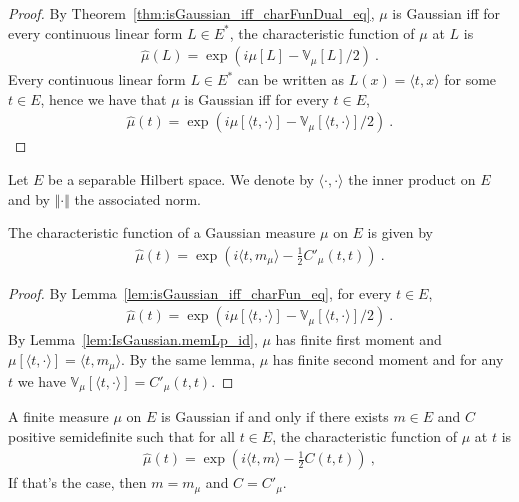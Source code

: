 \begin{proof}\leanok
By Theorem~\ref{thm:isGaussian_iff_charFunDual_eq}, $\mu$ is Gaussian iff for every continuous linear form $L \in E^*$, the characteristic function of $\mu$ at $L$ is
\begin{align*}
  \hat{\mu}(L) = \exp\left(i \mu[L] - \mathbb{V}_\mu[L] / 2\right) \: .
\end{align*}
Every continuous linear form $L \in E^*$ can be written as $L(x) = \langle t, x \rangle$ for some $t \in E$, hence we have that $\mu$ is Gaussian iff for every $t \in E$,
\begin{align*}
  \hat{\mu}(t) = \exp\left(i \mu[\langle t, \cdot \rangle] - \mathbb{V}_\mu[\langle t, \cdot \rangle] / 2\right) \: .
\end{align*}
\end{proof}

Let $E$ be a separable Hilbert space. We denote by $\langle \cdot, \cdot \rangle$ the inner product on $E$ and by $\Vert \cdot \Vert$ the associated norm.

\begin{lemma}\label{lem:IsGaussian.charFun_eq}
  \leanok
The characteristic function of a Gaussian measure $\mu$ on $E$ is given by
\begin{align*}
  \hat{\mu}(t) = \exp\left(i \langle t, m_\mu \rangle - \frac{1}{2} C'_\mu(t, t)\right) \: .
\end{align*}
\end{lemma}

\begin{proof}\leanok
By Lemma~\ref{lem:isGaussian_iff_charFun_eq}, for every $t \in E$,
\begin{align*}
  \hat{\mu}(t) = \exp\left(i \mu[\langle t, \cdot \rangle] - \mathbb{V}_\mu[\langle t, \cdot \rangle] / 2\right) \: .
\end{align*}
By Lemma~\ref{lem:IsGaussian.memLp_id}, $\mu$ has finite first moment and $\mu[\langle t, \cdot \rangle] = \langle t, m_\mu \rangle$. By the same lemma, $\mu$ has finite second moment and for any $t$ we have $\mathbb{V}_\mu[\langle t, \cdot\rangle] = C'_\mu(t, t)$.
\end{proof}

\begin{lemma}\label{lem:isGaussian_iff_gaussian_charFun}
  \leanok
A finite measure $\mu$ on $E$ is Gaussian if and only if there exists $m \in E$ and $C$ positive semidefinite such that for all $t \in E$, the characteristic function of $\mu$ at $t$ is
\begin{align*}
  \hat{\mu}(t) = \exp\left(i \langle t, m \rangle - \frac{1}{2} C(t, t)\right) \: ,
\end{align*}
If that's the case, then $m = m_\mu$ and $C = C'_\mu$.
\end{lemma}

